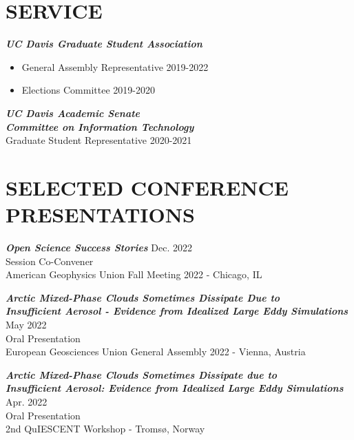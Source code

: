\documentclass[overlapped]{res}
\begin{document}
\begin{resume}
\begin{itemize}
                \end{itemize}
\section{SERVICE}
                {\sl \textbf{UC Davis Graduate Student Association}} \\
                
                \begin{itemize}
                    \item General Assembly Representative \hfill 2019-2022
                    \item Elections Committee \hfill 2019-2020
                \end{itemize} 
\newpage
                {\sl \textbf{UC Davis Academic Senate \\ Committee on Information Technology}} \\
                Graduate Student Representative \hfill 2020-2021


\section{SELECTED CONFERENCE PRESENTATIONS}

                {\sl \textbf{Open Science Success Stories}} \hfill Dec. 2022 \\
                Session Co-Convener \\
                American Geophysics Union Fall Meeting 2022 - Chicago, IL

                {\sl \textbf{Arctic Mixed-Phase Clouds Sometimes Dissipate Due to \\ Insufficient Aerosol - Evidence from Idealized Large Eddy Simulations}} \hfill May 2022 \\ 
                Oral Presentation \\
                European Geosciences Union General Assembly 2022 - Vienna, Austria
                
                {\sl \textbf{Arctic Mixed-Phase Clouds Sometimes Dissipate due to \\ Insufficient Aerosol: Evidence from Idealized Large Eddy Simulations }}\hfill Apr. 2022 \\
                Oral Presentation \\
                2nd QuIESCENT Workshop - Tromsø, Norway


\end{resume}
\end{document}
